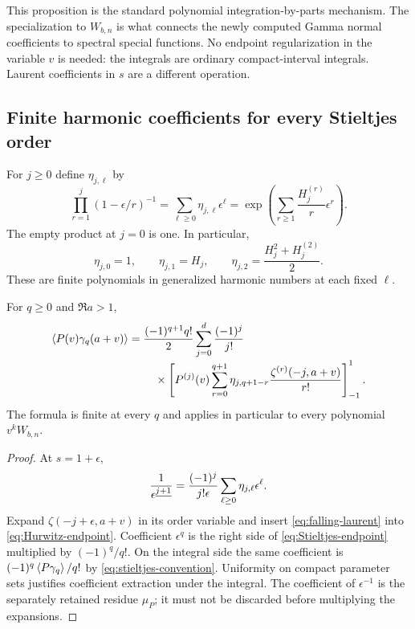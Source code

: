 This proposition is the standard polynomial integration-by-parts
mechanism. The specialization to $W_{b,n}$ is what connects the newly
computed Gamma normal coefficients to spectral special functions.
No endpoint regularization in the variable $v$ is needed: the integrals
are ordinary compact-interval integrals. Laurent coefficients in $s$
are a different operation.

\subsection{Finite harmonic coefficients for every Stieltjes order}
For $j\ge0$ define $\eta_{j,\ell}$ by
\begin{equation}\label{eq:eta}
 \prod_{r=1}^j(1-\epsilon/r)^{-1}
 =\sum_{\ell\ge0}\eta_{j,\ell}\epsilon^\ell
 =\exp\left(\sum_{r\ge1}\frac{H_j^{(r)}}r\epsilon^r\right).
\end{equation}
The empty product at $j=0$ is one. In particular,
\[
 \eta_{j,0}=1,\qquad \eta_{j,1}=H_j,\qquad
 \eta_{j,2}=\frac{H_j^2+H_j^{(2)}}2.
\]
These are finite polynomials in generalized harmonic numbers at each
fixed $\ell$.

\begin{theorem}\label{thm:Stieltjes}
For $q\ge0$ and $\Re a>1$,
\begin{equation}\label{eq:Stieltjes-endpoint}
\begin{split}
 \left\langle P(v)\gamma_q(a+v)\right\rangle
 ={}&\frac{(-1)^{q+1}q!}{2}
 \sum_{j=0}^d\frac{(-1)^j}{j!}\\[-2pt]
 &\quad\times\left[P^{(j)}(v)
 \sum_{r=0}^{q+1}\eta_{j,q+1-r}
       \frac{\zeta^{(r)}(-j,a+v)}{r!}\right]_{-1}^{1}.
\end{split}
\end{equation}
The formula is finite at every $q$ and applies in particular to every
polynomial $v^kW_{b,n}$.
\end{theorem}
\begin{proof}
At $s=1+\epsilon$,
\begin{equation}\label{eq:falling-laurent}
 \frac1{\epsilon^{\underline{j+1}}}
 =\frac{(-1)^j}{j!\epsilon}
       \sum_{\ell\ge0}\eta_{j,\ell}\epsilon^\ell.
\end{equation}
Expand $\zeta(-j+\epsilon,a+v)$ in its order variable and insert
\eqref{eq:falling-laurent} into \eqref{eq:Hurwitz-endpoint}. Coefficient
$\epsilon^q$ is the right side of \eqref{eq:Stieltjes-endpoint}
multiplied by $(-1)^q/q!$. On the integral side the same coefficient is
$(-1)^q\left\langle P\gamma_q\right\rangle/q!$ by
\eqref{eq:stieltjes-convention}. Uniformity on compact parameter sets
justifies coefficient extraction under the integral. The coefficient of
$\epsilon^{-1}$ is the separately retained residue $\mu_P$; it must not
be discarded before multiplying the expansions.
\end{proof}

